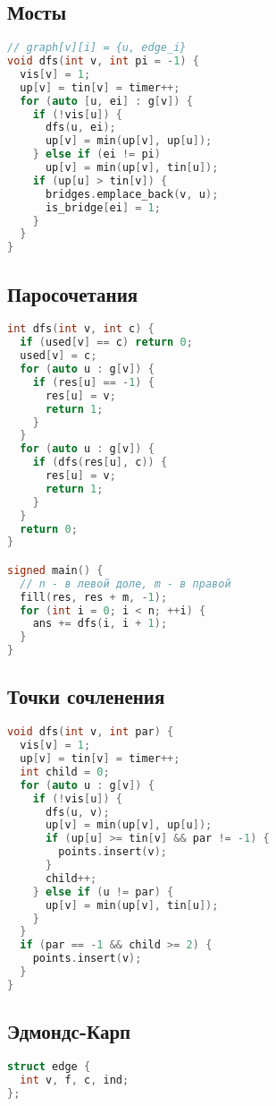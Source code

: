 \documentclass[9pt,a4paper,landscape,twosided]{extarticle}
\begin{document}
\begin{multicols*}{3}
\begin{lstlisting}[language=C++]
\end{lstlisting}

\subsection{Мосты}
\begin{lstlisting}[language=C++]
// graph[v][i] = {u, edge_i}
void dfs(int v, int pi = -1) {
  vis[v] = 1;
  up[v] = tin[v] = timer++;
  for (auto [u, ei] : g[v]) {
    if (!vis[u]) {
      dfs(u, ei);
      up[v] = min(up[v], up[u]);
    } else if (ei != pi)
      up[v] = min(up[v], tin[u]);
    if (up[u] > tin[v]) {
      bridges.emplace_back(v, u);
      is_bridge[ei] = 1;
    }
  }
}
\end{lstlisting}

\subsection{Паросочетания}
\begin{lstlisting}[language=C++]
int dfs(int v, int c) {
  if (used[v] == c) return 0;
  used[v] = c;
  for (auto u : g[v]) {
    if (res[u] == -1) {
      res[u] = v;
      return 1;
    }
  }
  for (auto u : g[v]) {
    if (dfs(res[u], c)) {
      res[u] = v;
      return 1;
    }
  }
  return 0;
}

signed main() {
  // n - в левой доле, m - в правой
  fill(res, res + m, -1);
  for (int i = 0; i < n; ++i) {
    ans += dfs(i, i + 1);
  }
}
\end{lstlisting}

\subsection{Точки сочленения}
\begin{lstlisting}[language=C++]
void dfs(int v, int par) {
  vis[v] = 1;
  up[v] = tin[v] = timer++;
  int child = 0;
  for (auto u : g[v]) {
    if (!vis[u]) {
      dfs(u, v);
      up[v] = min(up[v], up[u]);
      if (up[u] >= tin[v] && par != -1) {
        points.insert(v);
      }
      child++;
    } else if (u != par) {
      up[v] = min(up[v], tin[u]);
    }
  }
  if (par == -1 && child >= 2) {
    points.insert(v);
  }
}

\end{lstlisting}

\subsection{Эдмондс-Карп}
\begin{lstlisting}[language=C++]
struct edge {
  int v, f, c, ind;
};


\end{lstlisting}
\end{multicols*}
\end{document}
